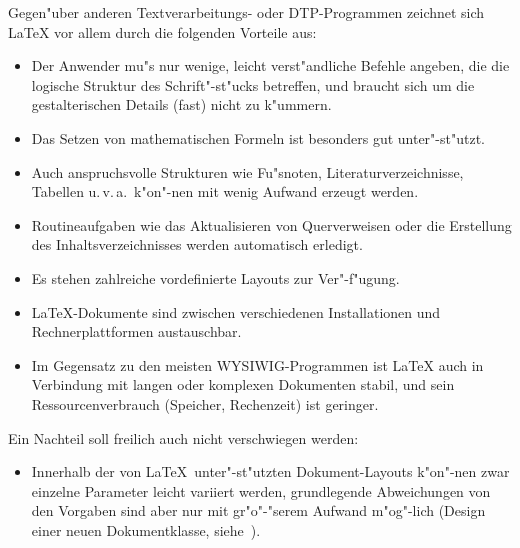 Gegen"uber anderen Textverarbeitungs- oder DTP-Programmen 
zeichnet sich \LaTeX{}
vor allem durch die folgenden Vorteile aus:
\begin{itemize}
\item Der Anwender mu"s nur wenige, leicht verst"andliche Befehle
  angeben, die die logische Struktur des Schrift"-st"ucks
  betreffen, und braucht sich um die gestalterischen Details
  (fast) nicht zu k"ummern.
\item Das Setzen von mathematischen Formeln ist besonders gut
  unter"-st"utzt.
\item Auch anspruchsvolle Strukturen wie Fu"snoten, Literaturverzeichnisse,
  Tabellen u.\,v.\,a.\  k"on"-nen mit wenig Aufwand erzeugt werden.
\item Routineaufgaben wie das Aktualisieren von Querverweisen
 oder die Erstellung des Inhaltsverzeichnisses 
 werden automatisch erledigt.
\item Es stehen zahlreiche vordefinierte Layouts zur Ver"-f"ugung.
\item \LaTeX-Dokumente sind zwischen verschiedenen Installationen und
 Rechnerplattformen austauschbar.
\item Im Gegensatz zu den meisten WYSIWIG-Programmen ist \LaTeX{} auch
  in Verbindung mit langen oder komplexen Dokumenten stabil,
  und sein Ressourcenverbrauch (Speicher, Rechenzeit) ist geringer.
\end{itemize}
Ein Nachteil soll freilich auch nicht verschwiegen werden:
\begin{itemize}
\item Innerhalb der von \LaTeX\ unter"-st"utzten Dokument-Layouts
  k"on"-nen zwar einzelne Parameter leicht variiert werden,
  grundlegende Abweichungen von den Vorgaben sind
  aber nur mit gr"o"-"serem Aufwand m"og"-lich (Design einer
  neuen Dokumentklasse, siehe~\cite{clsguide,lay,lay2,typografie}).
\end{itemize}

